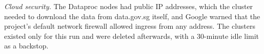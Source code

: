 \item \emph{Cloud security.} The Dataproc nodes had public IP addresses, which the cluster needed to download the data from data.gov.sg itself, and Google warned that the project's default network firewall allowed ingress from any address. The clusters existed only for this run and were deleted afterwards, with a 30-minute idle limit as a backstop.
